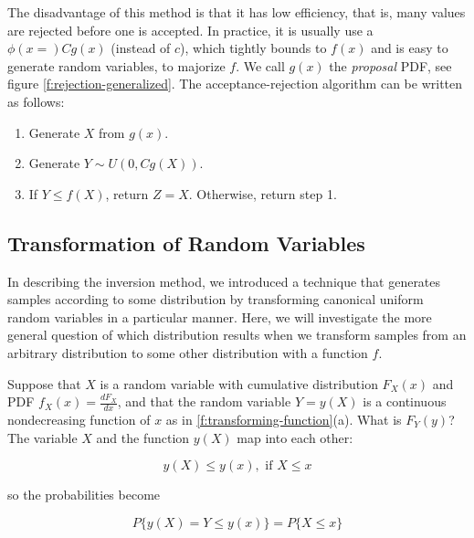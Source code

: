 The disadvantage of this method is that it has low efficiency, that is, many values are rejected before one is accepted. In practice, it is usually use a $\phi (x=)Cg(x)$ (instead of $c$), which tightly bounds to $f(x)$ and is easy to generate random variables, to majorize $f$. We call $g(x)$ the \textit{proposal} PDF, see figure \ref{f:rejection-generalized}. The acceptance-rejection algorithm can be written as follows:

\begin{enumerate}
	\item Generate $X$ from $g(x)$.
	\item Generate $Y\sim U(0,Cg(X))$.
	\item If $Y\leq f(X)$, return $Z=X$. Otherwise, return step 1. 
\end{enumerate}


\subsection{Transformation of Random Variables}\label{sec:Transformation-of-Random-Variables}
In describing the inversion method, we introduced a technique that generates samples according to some distribution by transforming canonical uniform random variables in a particular manner. Here, we will investigate the more general question of which distribution results when we transform samples from an arbitrary distribution to some other distribution with a function $f$.

Suppose that $X$ is a random variable with cumulative distribution $F_X(x)$ and PDF $f_X(x)=\frac{dF_X}{dx}$, and that the random variable $Y=y(X)$ is a continuous nondecreasing function of $x$ as in \ref{f:transforming-function}(a). What is $F_Y(y)$? The variable $X$ and the function $y(X)$ map into each other:

\begin{equation}
	y(X)\leq y(x), \text{ if } X\leq x
\end{equation}

so the probabilities become

\begin{equation}
	P\{y(X)=Y\leq y(x)\}=P\{X\leq x\}
\end{equation}


